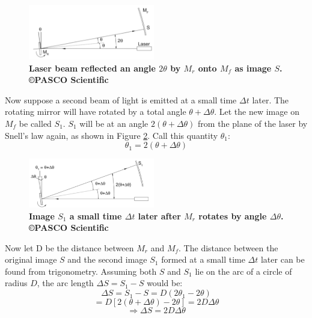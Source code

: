 \documentclass[twocolumn]{article}
\begin{document}
	\begin{figure}[!ht]
		\centering
		\includegraphics[width=0.49\textwidth]{Images/MrMfAngles.png}
		\caption{\textbf{Laser beam reflected an angle $2\theta$ by $M_r$ onto $M_f$ as image $S$.\cite{lee_instruction_????} \copyright PASCO Scientific}}
		\label{fig:MrMfAngles}
	\end{figure}
	Now suppose a second beam of light is emitted at a small time $\Delta t$ later. 
	The rotating mirror will have rotated by a total angle  $\theta + \Delta \theta$.
	Let the new image on $M_f$ be called $S_1$. 
	$S_1$ will be at an angle $2(\theta + \Delta \theta)$ from the plane of the laser by Snell's law again, as shown in Figure \ref{fig:MrMfAngles2}. 
	Call this quantity $\theta_1$:
	\begin{equation}
		\theta_1 = 2(\theta + \Delta \theta)
	\end{equation}
	\begin{figure}[!ht]
		\centering
		\includegraphics[width=0.49\textwidth]{Images/MrMfAngles2.png}
		\caption{\textbf{Image $S_1$ a small time $\Delta t$ later after $M_r$ rotates by angle $\Delta\theta$.\cite{lee_instruction_????} \copyright PASCO Scientific}}
		\label{fig:MrMfAngles2}
	\end{figure}
	
	Now let D be the distance between $M_r$ and $M_f$. 
	The distance between the original image $S$ and the second image $S_1$ formed at a small time $\Delta t$ later can be found from trigonometry. 
	Assuming both $S$ and $S_1$ lie on the arc of a circle of radius $D$, the arc length $\Delta S = S_1-S$ would be:
	\begin{equation*}
		\Delta S = S_1 - S = D(2\theta_1 - 2\theta)
	\end{equation*}
	\begin{equation*}
		= D[2(\theta + \Delta \theta) - 2\theta] = 2D\Delta\theta
	\end{equation*}
	\begin{equation}
		\Rightarrow \Delta S = 2D\Delta\theta
		\label{eq:DeltaS}
	\end{equation}
	
\end{document}
